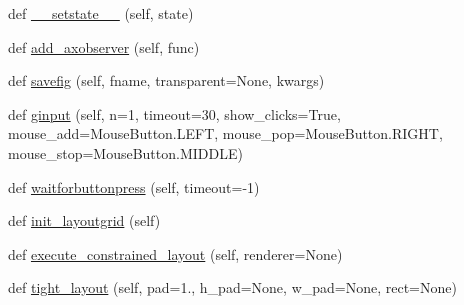 \begin{DoxyCompactItemize}
\item 
def \hyperlink{classmatplotlib_1_1figure_1_1Figure_a3e6b3cd3ba88f84412e3cc3f7b7579fb}{\+\_\+\+\_\+setstate\+\_\+\+\_\+} (self, state)
\item 
def \hyperlink{classmatplotlib_1_1figure_1_1Figure_a35dfbda5abb1d2fc8a22b9647d378e12}{add\+\_\+axobserver} (self, func)
\item 
def \hyperlink{classmatplotlib_1_1figure_1_1Figure_a2d305a2a362c405320b0725a8c02c5b2}{savefig} (self, fname, transparent=None, kwargs)
\item 
def \hyperlink{classmatplotlib_1_1figure_1_1Figure_ab58d16759405fcc53d3da1633daff3d0}{ginput} (self, n=1, timeout=30, show\+\_\+clicks=True, mouse\+\_\+add=Mouse\+Button.\+L\+E\+FT, mouse\+\_\+pop=Mouse\+Button.\+R\+I\+G\+HT, mouse\+\_\+stop=Mouse\+Button.\+M\+I\+D\+D\+LE)
\item 
def \hyperlink{classmatplotlib_1_1figure_1_1Figure_a7270364644a2289a1113aa6b61e23e7a}{waitforbuttonpress} (self, timeout=-\/1)
\item 
def \hyperlink{classmatplotlib_1_1figure_1_1Figure_a5f86c86c033586ea7d732dd0ba856659}{init\+\_\+layoutgrid} (self)
\item 
def \hyperlink{classmatplotlib_1_1figure_1_1Figure_ab7f2a1534708b2e025b628a33244d162}{execute\+\_\+constrained\+\_\+layout} (self, renderer=None)
\item 
def \hyperlink{classmatplotlib_1_1figure_1_1Figure_a3c06e4a0479a4f539f312c5fc9b26ead}{tight\+\_\+layout} (self, pad=1., h\+\_\+pad=None, w\+\_\+pad=None, rect=None)
\end{DoxyCompactItemize}
